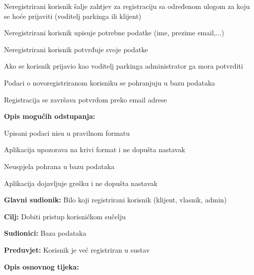 \begin{packed_item}
\begin{packed_item}
\begin{packed_enum}
    					\item Neregistrirani korisnik šalje zahtjev za registraciju sa određenom ulogom za koju se hoće prijaviti (voditelj parkinga ili klijent)
    					\item Neregistrirani korisnik upisuje potrebne podatke (ime, prezime email,...)
    					\item Neregistrirani korisnik potvrđuje svoje podatke
    					\item Ako se korisnik prijavio kao voditelj parkinga administrator ga mora potvrditi
    					\item Podaci o novoregistriranom korisniku se pohranjuju u bazu podataka
    					\item Registracija se završava potvrdom preko email adrese
    				\end{packed_enum}
    				
    				\item  \textbf{Opis mogućih odstupanja:}
    				
    				\item[] \begin{packed_item}
    					
    					\item[2.a] Upisani podaci nisu u pravilnom formatu
    					\item[] \begin{packed_enum}
    						
    						\item Aplikacija upozorava na krivi format i ne dopušta nastavak
    						
    					\end{packed_enum}
    					\item[5.a] Neuspjela pohrana u bazu podataka
    					\item[] \begin{packed_enum}
    						
    						\item Aplikacija dojavljuje grešku i ne dopušta nastavak
    						
    					\end{packed_enum}
    					
    				\end{packed_item}
    			\end{packed_item}
    				\noindent \underbar{\textbf{UC12 - Prijava u sustav}}
    			\begin{packed_item}
    				
    				\item \textbf{Glavni sudionik:} Bilo koji registrirani korisnik (klijent, vlasnik, admin)
    				\item  \textbf{Cilj:} Dobiti pristup korisničkom sučelju  
    				\item  \textbf{Sudionici:} Baza podataka
    				\item  \textbf{Preduvjet:} Korisnik je već registriran u sustav
    				\item  \textbf{Opis osnovnog tijeka:}
    				

\end{packed_item}
\end{packed_item}
